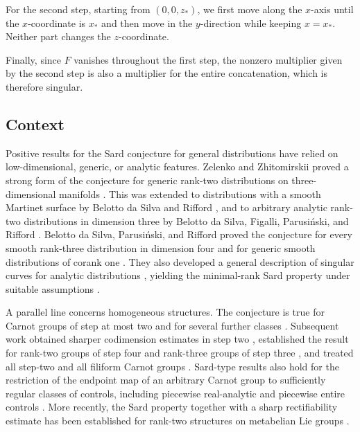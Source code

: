 \documentclass[11pt]{amsart}
\numberwithin{equation}{section}
\theoremstyle{remark}
\begin{document}
For the second step, starting from $(0,0,z_*)$, we first move along the
$x$-axis until the $x$-coordinate is $x_*$ and then move in the
$y$-direction while keeping $x=x_*$. Neither part changes the
$z$-coordinate. 

Finally, since $F$ vanishes throughout the first step,  the nonzero multiplier given by the second step is also a multiplier for the entire concatenation, which is therefore singular. 




\subsection*{Context}
Positive results for the Sard conjecture for general distributions have relied on low-dimensional,
generic, or analytic features.  Zelenko and Zhitomirskii proved a
strong form of the conjecture for generic rank-two distributions on
three-dimensional manifolds \cite{ZZ}.  This was extended to
distributions with a smooth Martinet surface by Belotto da Silva and
Rifford \cite{BdSR}, and to arbitrary analytic rank-two distributions
in dimension three by Belotto da Silva, Figalli, Parusi\'nski, and
Rifford \cite{BdSFPR}.  Belotto da Silva, Parusi\'nski, and Rifford
proved the conjecture for every smooth rank-three distribution in
dimension four and for generic smooth distributions of corank one
\cite{BdSPR}.  They also developed a general description of singular
curves for analytic distributions \cite{BdSPRSubanalytic}, yielding the minimal-rank Sard property under suitable assumptions \cite{BdSPRMinimalRank}.

A parallel line concerns homogeneous structures.  The conjecture is true for Carnot groups of step at most two and for several further
classes \cite{AGL,LDMOPV}.  Subsequent work obtained sharper
codimension estimates in step two \cite{OV}, established the result for
rank-two groups of step four and rank-three groups of step three
\cite{BV}, and treated all step-two and all filiform Carnot groups
\cite{BNV}.  Sard-type results also hold for the restriction of the
endpoint map of an arbitrary Carnot group to sufficiently regular
classes of controls, including piecewise real-analytic and piecewise
entire controls \cite{LRT}.  More recently, the Sard property together
with a sharp rectifiability estimate has been established for rank-two
structures on metabelian Lie groups \cite{LDLNPR}. 
\end{document}
